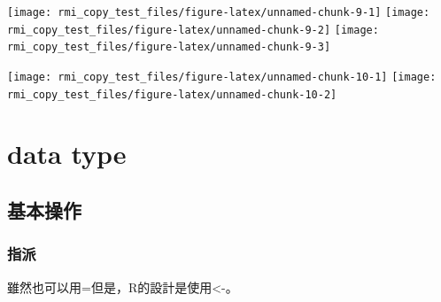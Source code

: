 \documentclass[]{book}
\newenvironment{Shaded}{\begin{snugshade}}{\end{snugshade}}
\newcommand{\DecValTok}[1]{\textcolor[rgb]{0.00,0.00,0.81}{#1}}
\newcommand{\KeywordTok}[1]{\textcolor[rgb]{0.13,0.29,0.53}{\textbf{#1}}}
\newcommand{\NormalTok}[1]{#1}
\newcommand{\OperatorTok}[1]{\textcolor[rgb]{0.81,0.36,0.00}{\textbf{#1}}}
\theoremstyle{definition}
\theoremstyle{definition}
\theoremstyle{definition}
\theoremstyle{remark}
\begin{document}
\begin{Shaded}
\end{Shaded}

\begin{center}\texttt{[image: rmi\_copy\_test\_files/figure-latex/unnamed-chunk-9-1]} \texttt{[image: rmi\_copy\_test\_files/figure-latex/unnamed-chunk-9-2]} \texttt{[image: rmi\_copy\_test\_files/figure-latex/unnamed-chunk-9-3]} \end{center}

\begin{Shaded}
\end{Shaded}

\begin{center}\texttt{[image: rmi\_copy\_test\_files/figure-latex/unnamed-chunk-10-1]} \texttt{[image: rmi\_copy\_test\_files/figure-latex/unnamed-chunk-10-2]} \end{center}

\hypertarget{data-type}{%
\chapter{data type}\label{data-type}}

\section{基本操作}

\subsection{指派}

雖然也可以用=但是，R的設計是使用\textless{}-。
\end{document}
